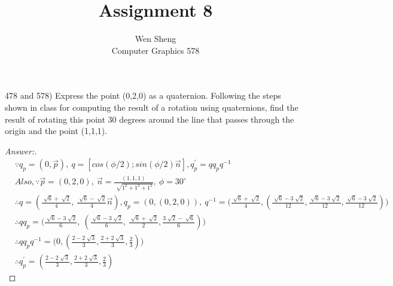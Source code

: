 \documentclass[12pt]{article}
\newenvironment{exercise}[2][Exercise]{\begin{trivlist}
\item[\hskip \labelsep {\bfseries #1}\hskip \labelsep {\bfseries #2.}]}{\end{trivlist}}
\begin{document}
 
 
 
\title{ Assignment 8}%
\author{Wen Sheng\\ %
Computer Graphics 578 } %
 
\maketitle
 
\begin{exercise}{1} %
 (478 and 578) Express the point (0,2,0) as a quaternion. Following the steps shown in class for computing the result of a rotation using quaternions, find the result of rotating this point 30 degrees around the line that passes through the origin and the point (1,1,1).
\end{exercise}
 
\begin{proof}[Answer:]
\begin{align*}
&\because q_p = (0, \vec{p}),\  q = [cos(\phi / 2); sin(\phi /2)\vec{n}], q^{'}_p = qq_pq^{-1}\\
&Also, \because  \vec{p} = (0, 2, 0), \ \vec{n}= \frac {(1, 1, 1)} { \sqrt[]{1^2 + 1^2 + 1^2}},  \ \phi = 30^\circ \\
&\therefore q = (\frac{\sqrt[]{6} + \sqrt[]{2}}{4},\  \frac{\sqrt[]{6} - \sqrt[]{2}}{4}\vec{n}) ,  q_p = (0, (0, 2, 0)), \ q^{-1} = \big(\frac{\sqrt[]{6} + \sqrt[]{2}}{4}, 
(\frac{\sqrt[]{6} - 3\sqrt[]{2}}{12}, \frac{\sqrt[]{6} - 3\sqrt[]{2}}{12}, \frac{\sqrt[]{6} - 3\sqrt[]{2}}{12})\big)\\
&\therefore qq_p=\big(\frac{\sqrt[]{6} - 3\sqrt[]{2}}{6}, \ (\frac{\sqrt[]{6} - 3\sqrt[]{2}}{6}, \ \frac{\sqrt[]{6} + \sqrt[]{2}}{2}  , \frac{3\sqrt[]{2} - \sqrt[]{6}}{6})\big)\\
&\therefore qq_pq^{-1} = \big(0, (\frac{2 - 2\sqrt[]{3}}{3}, \frac{2 + 2\sqrt[]{3}}{3}, \frac{2}{3})\big)\\
&\therefore q^{'}_p = (\frac{2 - 2\sqrt[]{3}}{3}, \frac{2 + 2\sqrt[]{3}}{3}, \frac{2}{3})
\end{align*}
\end{proof}
 
\end{document}
